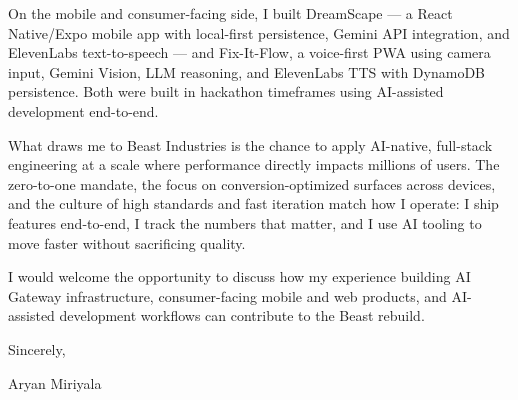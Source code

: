 \documentclass[letterpaper,11pt]{article}
\begin{document}
\vspace{6pt}

On the mobile and consumer-facing side, I built DreamScape — a React Native/Expo mobile app with local-first persistence, Gemini API integration, and ElevenLabs text-to-speech — and Fix-It-Flow, a voice-first PWA using camera input, Gemini Vision, LLM reasoning, and ElevenLabs TTS with DynamoDB persistence. Both were built in hackathon timeframes using AI-assisted development end-to-end.

\vspace{6pt}

What draws me to Beast Industries is the chance to apply AI-native, full-stack engineering at a scale where performance directly impacts millions of users. The zero-to-one mandate, the focus on conversion-optimized surfaces across devices, and the culture of high standards and fast iteration match how I operate: I ship features end-to-end, I track the numbers that matter, and I use AI tooling to move faster without sacrificing quality.

\vspace{6pt}

I would welcome the opportunity to discuss how my experience building AI Gateway infrastructure, consumer-facing mobile and web products, and AI-assisted development workflows can contribute to the Beast rebuild.

\vspace{12pt}

Sincerely,

\vspace{6pt}

Aryan Miriyala
\end{document}
